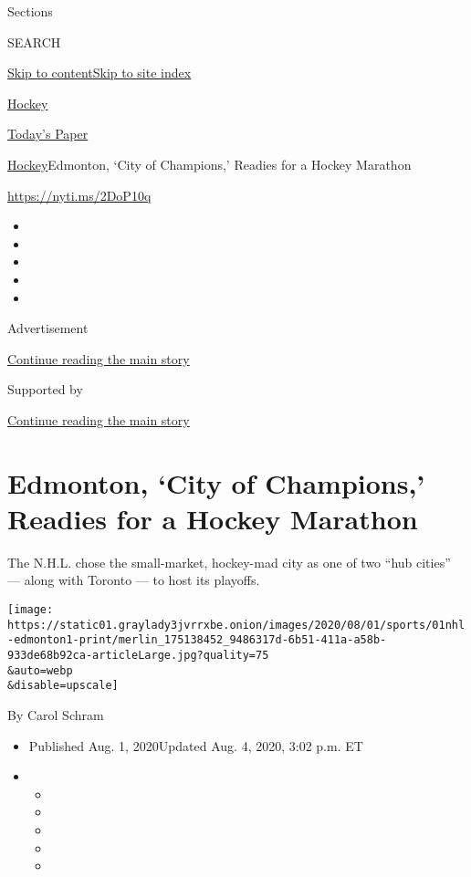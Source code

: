 Sections

SEARCH

\protect\hyperlink{site-content}{Skip to
content}\protect\hyperlink{site-index}{Skip to site index}

\href{https://www.nytimes3xbfgragh.onion/section/sports/hockey}{Hockey}

\href{https://myaccount.nytimes3xbfgragh.onion/auth/login?response_type=cookie\&client_id=vi}{}

\href{https://www.nytimes3xbfgragh.onion/section/todayspaper}{Today's
Paper}

\href{/section/sports/hockey}{Hockey}\textbar{}Edmonton, `City of
Champions,' Readies for a Hockey Marathon

\url{https://nyti.ms/2DoP10q}

\begin{itemize}
\item
\item
\item
\item
\item
\end{itemize}

Advertisement

\protect\hyperlink{after-top}{Continue reading the main story}

Supported by

\protect\hyperlink{after-sponsor}{Continue reading the main story}

\hypertarget{edmonton-city-of-champions-readies-for-a-hockey-marathon}{%
\section{Edmonton, `City of Champions,' Readies for a Hockey
Marathon}\label{edmonton-city-of-champions-readies-for-a-hockey-marathon}}

The N.H.L. chose the small-market, hockey-mad city as one of two ``hub
cities'' --- along with Toronto --- to host its playoffs.

\texttt{[image: https://static01.graylady3jvrrxbe.onion/images/2020/08/01/sports/01nhl-edmonton1-print/merlin\_175138452\_9486317d-6b51-411a-a58b-933de68b92ca-articleLarge.jpg?quality=75\\\&auto=webp\\\&disable=upscale]}

By Carol Schram

\begin{itemize}
\item
  Published Aug. 1, 2020Updated Aug. 4, 2020, 3:02 p.m. ET
\item
  \begin{itemize}
  \item
  \item
  \item
  \item
  \item
  \end{itemize}
\end{itemize}

